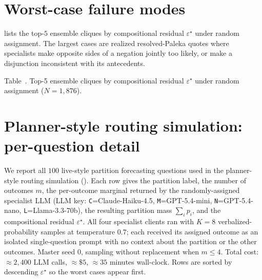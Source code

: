 \documentclass{article}
\theoremstyle{plain}
\theoremstyle{definition}
\theoremstyle{remark}
\newcommand{\eps}{\varepsilon}
\begin{document}
\section{Worst-case failure modes}
\label{app:failure_modes}

 lists the top-$5$ ensemble cliques by
compositional residual $\eps^\star$ under random assignment. The
largest cases are realized resolved-Paleka quotes where specialists
make opposite sides of a negation jointly too likely, or make a
disjunction inconsistent with its antecedents.

\begin{minipage}{\linewidth}
\centering
{}
\label{tab:failure_modes}
{\small Table~\thetable. Top-5 ensemble cliques by compositional
residual $\eps^\star$ under random assignment ($N{=}1{,}876$).\par}
\tiny

\end{minipage}

\section{Planner-style routing simulation: per-question detail}
\label{app:realagent}

We report all $100$ live-style partition forecasting questions
used in the planner-style routing simulation ().
Each row gives the partition label, the number of outcomes $m$,
the per-outcome marginal returned by the randomly-assigned
specialist LLM (LLM key: \texttt{C}=Claude-Haiku-4.5,
\texttt{M}=GPT-5.4-mini, \texttt{N}=GPT-5.4-nano,
\texttt{L}=Llama-3.3-70b), the resulting partition mass
$\sum_i p_i$, and the compositional residual $\eps^\star$. All
four specialist clients ran with $K{=}8$ verbalized-probability
samples at temperature $0.7$; each received its assigned outcome
as an isolated single-question prompt with no context about the
partition or the other outcomes. Master seed $0$, sampling
without replacement when $m\!\le\!4$. Total cost:
$\approx\!2{,}400$ LLM calls, $\approx\!\$5$,
$\approx\!35$ minutes wall-clock. Rows are sorted by descending
$\eps^\star$ so the worst cases appear first.


\end{document}
